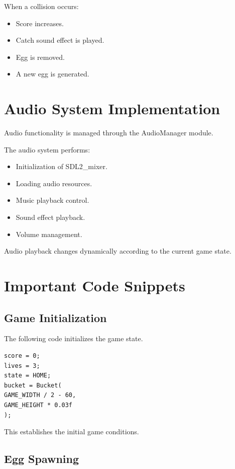 \documentclass[12pt,a4paper]{report}
\begin{document}
When a collision occurs:

\begin{itemize}
\item Score increases.
\item Catch sound effect is played.
\item Egg is removed.
\item A new egg is generated.
\end{itemize}

\section{Audio System Implementation}

Audio functionality is managed through the AudioManager module.

The audio system performs:

\begin{itemize}
\item Initialization of SDL2\_mixer.
\item Loading audio resources.
\item Music playback control.
\item Sound effect playback.
\item Volume management.
\end{itemize}

Audio playback changes dynamically according to the current game state.

\section{Important Code Snippets}

\subsection*{Game Initialization}

The following code initializes the game state.

\begin{verbatim}
score = 0;
lives = 3;
state = HOME;
bucket = Bucket(
GAME_WIDTH / 2 - 60,
GAME_HEIGHT * 0.03f
);
\end{verbatim}

This establishes the initial game conditions.

\subsection*{Egg Spawning}
\end{document}
